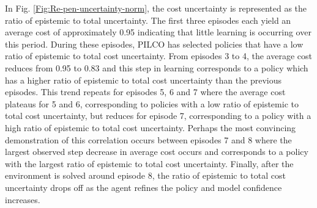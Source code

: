 In Fig. \ref{Fig:Re-pen-uncertainty-norm}, the cost uncertainty is represented as the ratio of epistemic to total uncertainty. The first three episodes each yield an average cost of approximately 0.95 indicating that little learning is occurring over this period. During these episodes, PILCO has selected policies that have a low ratio of epistemic to total cost uncertainty. From episodes 3 to 4, the average cost reduces from 0.95 to 0.83 and this step in learning corresponds to a policy which has a higher ratio of epistemic to total cost uncertainty than the previous episodes. This trend repeats for episodes 5, 6 and 7 where the average cost plateaus for 5 and 6, corresponding to policies with a low ratio of epistemic to total cost uncertainty, but reduces for episode 7, corresponding to a policy with a high ratio of epistemic to total cost uncertainty. Perhaps the most convincing demonstration of this correlation occurs between episodes 7 and 8 where the largest observed step decrease in average cost occurs and corresponds to a policy with the largest ratio of epistemic to total cost uncertainty. Finally, after the environment is solved around episode 8, the ratio of epistemic to total cost uncertainty drops off as the agent refines the policy and model confidence increases. 

